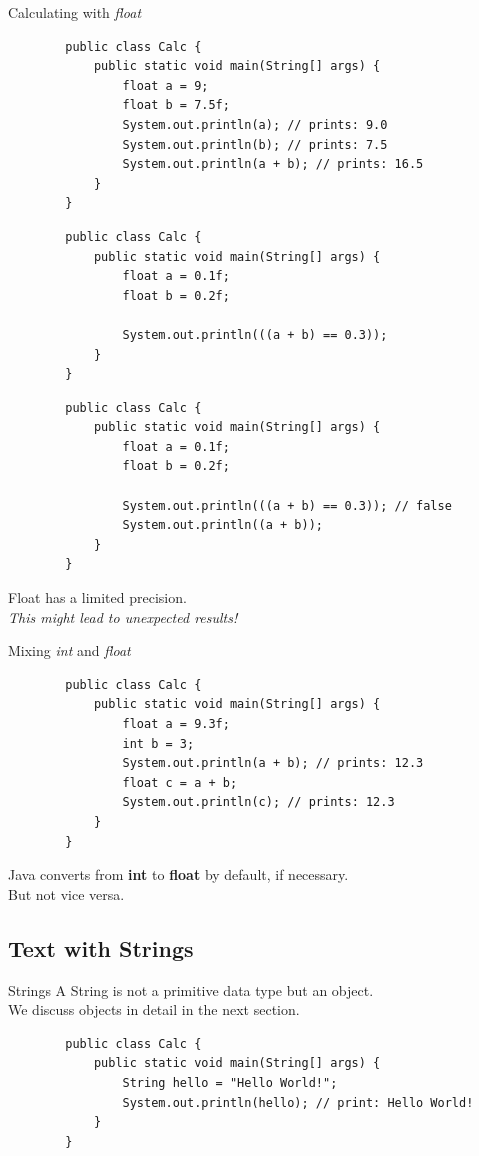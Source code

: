 \begin{frame}{Calculating with \emph{float}}
	\begin{lstlisting}
		public class Calc {
			public static void main(String[] args) {
				float a = 9;
				float b = 7.5f;
				System.out.println(a); // prints: 9.0
				System.out.println(b); // prints: 7.5
				System.out.println(a + b); // prints: 16.5
			}
		}
	\end{lstlisting}
	
	\framebreak
	\begin{lstlisting}
		public class Calc {
			public static void main(String[] args) {
				float a = 0.1f;
				float b = 0.2f;
				
				System.out.println(((a + b) == 0.3));
			}
		}
	\end{lstlisting}
	
	
	\framebreak
	\begin{lstlisting}
		public class Calc {
			public static void main(String[] args) {
				float a = 0.1f;
				float b = 0.2f;
				
				System.out.println(((a + b) == 0.3)); // false
				System.out.println((a + b));
			}
		}
	\end{lstlisting}
	Float has a limited precision. \\
	\emph{This might lead to unexpected results!}
\end{frame}

\begin{frame}[fragile]{Mixing \emph{int} and \emph{float}}
	\begin{lstlisting}
		public class Calc {
			public static void main(String[] args) {
				float a = 9.3f;
				int b = 3;
				System.out.println(a + b); // prints: 12.3
				float c = a + b;
				System.out.println(c); // prints: 12.3
			}
		}
	\end{lstlisting}
	Java converts from \textbf{int} to \textbf{float} by default, if necessary. \\
	But not vice versa.
\end{frame}

\subsection{Text with Strings}

\begin{frame}[fragile]{Strings}
	A String is not a primitive data type but an object. \\
	We discuss objects in detail in the next section.
	\begin{lstlisting}
		public class Calc {
			public static void main(String[] args) {
				String hello = "Hello World!";
				System.out.println(hello); // print: Hello World!
			}
		}
	\end{lstlisting}
\end{frame}

